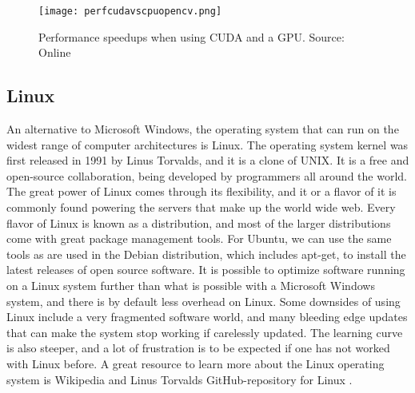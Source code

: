 \begin{figure}[ht]
    \centering
    \texttt{[image: perfcudavscpuopencv.png]}
    \caption{Performance speedups when using CUDA and a GPU. Source: Online \citet{opencvcuda15}}
    \label{fig:perfcudavscpuopencv}
\end{figure}
\FloatBarrier

\subsection{Linux}
An alternative to Microsoft Windows, the operating system that can run on the widest range of computer architectures is Linux. The operating system kernel was first released in 1991 by Linus Torvalds, and it is a clone of UNIX.
It is a free and open-source collaboration, being developed by programmers all around the world.
The great power of Linux comes through its flexibility, and it or a flavor of it is commonly found powering the servers that make up the world wide web.
Every flavor of Linux is known as a distribution, and most of the larger distributions come with great package management tools.
For Ubuntu, we can use the same tools as are used in the Debian distribution, which includes apt-get, to install the latest releases of open source software.
It is possible to optimize software running on a Linux system further than what is possible with a Microsoft Windows system, and there is by default less overhead on Linux.
Some downsides of using Linux include a very fragmented software world, and many bleeding edge updates that can make the system stop working if carelessly updated. The learning curve is also steeper, and a lot of frustration is to be expected if one has not worked with Linux before.
A great resource to learn more about the Linux operating system is Wikipedia \citep{wikiLinux15} and Linus Torvalds GitHub-repository for Linux \citep{githubLinux15}.
